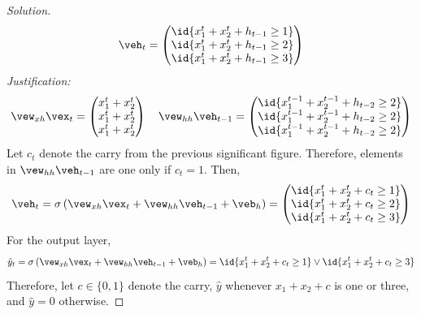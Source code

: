 \documentclass{article}
\begin{document}
\begin{proof}[Solution]
		\begin{align}
			\veh_t = 
			\begin{pmatrix}
				\id{x_1^t + x_2^t + h_{t-1} \geq 1} \\
				\id{x_1^t + x_2^t + h_{t-1} \geq 2} \\
				\id{x_1^t + x_2^t + h_{t-1} \geq 3}
			\end{pmatrix}
		\end{align}
		\emph{Justification:} \\
		\begin{align}
			\vew_{xh} \vex_t =
			\begin{pmatrix}
				x_1^t + x_2^t \\
				x_1^t + x_2^t \\
				x_1^t + x_2^t \\
			\end{pmatrix} \quad
			\vew_{hh} \veh_{t-1} =  
			\begin{pmatrix}
				\id{x_1^{t-1} + x_2^{t-1} + h_{t-2} \geq 2} \\
				\id{x_1^{t-1} + x_2^{t-1} + h_{t-2} \geq 2} \\
				\id{x_1^{t-1} + x_2^{t-1} + h_{t-2} \geq 2} \\
			\end{pmatrix}
		\end{align}
		Let $c_t$ denote the carry from the previous significant figure. Therefore, elements in $\vew_{hh} \veh_{t-1}$ are one only if $c_t = 1$.
		Then,
		\begin{align}
			\veh_t
			= \sigma\left(
				\vew_{xh} \vex_t
				+ \vew_{hh} \veh_{t-1}
				+ \veb_h
			\right)
			= \begin{pmatrix}
				\id{x_1^t + x_2^t + c_t \geq 1} \\
				\id{x_1^t + x_2^t + c_t \geq 2} \\
				\id{x_1^t + x_2^t + c_t \geq 3}
			\end{pmatrix}
		\end{align}
		For the output layer, 
		\begin{align}
			\hat{y}_t = \sigma\left(
				\vew_{xh} \vex_t
				+ \vew_{hh} \veh_{t-1}
				+ \veb_h
			\right) = \id{x_1^t + x_2^t + c_t \geq 1} \lor \id{x_1^t + x_2^t + c_t \geq 3}
		\end{align}
		Therefore, let $c \in \{0, 1\}$ denote the carry, $\hat{y}$ whenever $x_1 + x_2 + c$ is one or three, and $\hat{y} = 0$ otherwise.
	\end{proof}
\end{document}
